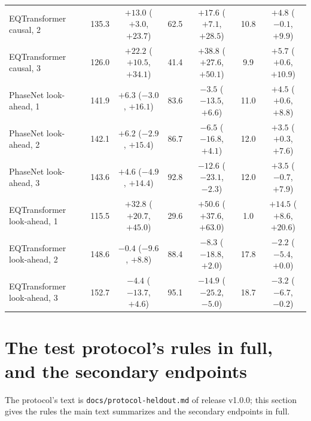 \documentclass[11pt,a4paper]{article}
\newcommand{\tool}[1]{\nolinkurl{#1}}
\begin{document}
\begin{table}[htbp]
{\begin{tabular}{@{}lcccccc@{}}
    EQTransformer causal, 2 & 135.3 & $+13.0$ ($+3.0$, $+23.7$) & 62.5 & $+17.6$ ($+7.1$, $+28.5$) & 10.8 & $+4.8$ ($-0.1$, $+9.9$) \\
    EQTransformer causal, 3 & 126.0 & $+22.2$ ($+10.5$, $+34.1$) & 41.4 & $+38.8$ ($+27.6$, $+50.1$) & 9.9 & $+5.7$ ($+0.6$, $+10.9$) \\
    PhaseNet look-ahead, 1 & 141.9 & $+6.3$ ($-3.0$, $+16.1$) & 83.6 & $-3.5$ ($-13.5$, $+6.6$) & 11.0 & $+4.5$ ($+0.6$, $+8.8$) \\
    PhaseNet look-ahead, 2 & 142.1 & $+6.2$ ($-2.9$, $+15.4$) & 86.7 & $-6.5$ ($-16.8$, $+4.1$) & 12.0 & $+3.5$ ($+0.3$, $+7.6$) \\
    PhaseNet look-ahead, 3 & 143.6 & $+4.6$ ($-4.9$, $+14.4$) & 92.8 & $-12.6$ ($-23.1$, $-2.3$) & 12.0 & $+3.5$ ($-0.7$, $+7.9$) \\
    EQTransformer look-ahead, 1 & 115.5 & $+32.8$ ($+20.7$, $+45.0$) & 29.6 & $+50.6$ ($+37.6$, $+63.0$) & 1.0 & $+14.5$ ($+8.6$, $+20.6$) \\
    EQTransformer look-ahead, 2 & 148.6 & $-0.4$ ($-9.6$, $+8.8$) & 88.4 & $-8.3$ ($-18.8$, $+2.0$) & 17.8 & $-2.2$ ($-5.4$, $+0.0$) \\
    EQTransformer look-ahead, 3 & 152.7 & $-4.4$ ($-13.7$, $+4.6$) & 95.1 & $-14.9$ ($-25.2$, $-5.0$) & 18.7 & $-3.2$ ($-6.7$, $-0.2$) \\
    \bottomrule
  \end{tabular}}
\end{table}

\clearpage
\section{The test protocol's rules in full, and the secondary endpoints}\label{s:protocolfull}

The protocol's text is \tool{docs/protocol-heldout.md} of release v1.0.0; this section
gives the rules the main text summarizes and the secondary endpoints in full.
\end{document}
